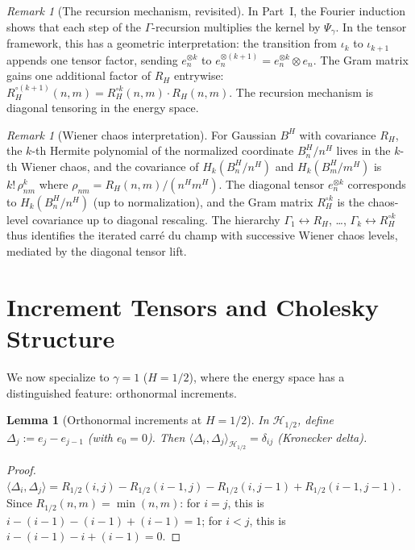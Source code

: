 \documentclass[11pt,a4paper]{article}
\theoremstyle{plain}
\newtheorem{lemma}[theorem]{Lemma}
\theoremstyle{definition}
\theoremstyle{remark}
\newtheorem{remark}[theorem]{Remark}
\begin{document}
\begin{remark}[The recursion mechanism, revisited]
\label{rem:recursion}
In Part~I, the Fourier induction shows that each step
of the $\Gamma$-recursion multiplies the kernel by
$\Psi_\gamma$.  In the tensor framework, this has a
geometric interpretation: the transition from
$\iota_k$ to $\iota_{k+1}$ appends one tensor factor,
sending $e_n^{\otimes k}$ to $e_n^{\otimes(k+1)}
= e_n^{\otimes k} \otimes e_n$.  The Gram matrix
gains one additional factor of $R_H$ entrywise:
$R_H^{\circ(k+1)}(n,m) = R_H^{\circ k}(n,m) \cdot R_H(n,m)$.
The recursion mechanism is diagonal tensoring in the
energy space.
\end{remark}

\begin{remark}[Wiener chaos interpretation]
\label{rem:chaos}
For Gaussian $B^H$ with covariance $R_H$, the
$k$-th Hermite polynomial of the normalized coordinate
$B_n^H / n^H$ lives in the $k$-th Wiener chaos, and the
covariance of $H_k(B_n^H/n^H)$ and $H_k(B_m^H/m^H)$
is $k!\,\rho_{nm}^k$ where
$\rho_{nm} = R_H(n,m)/(n^H m^H)$.
The diagonal tensor $e_n^{\otimes k}$ corresponds to
$H_k(B_n^H/n^H)$ (up to normalization), and the Gram
matrix $R_H^{\circ k}$ is the chaos-level covariance
up to diagonal rescaling.  The hierarchy
$\Gamma_1 \leftrightarrow R_H$, \ldots,
$\Gamma_k \leftrightarrow R_H^{\circ k}$
thus identifies the iterated carr\'e du champ with
successive Wiener chaos levels, mediated by the diagonal
tensor lift.
\end{remark}


\section{Increment Tensors and Cholesky Structure}
\label{sec:increment}

We now specialize to $\gamma = 1$ ($H = 1/2$),
where the energy space has a distinguished feature:
orthonormal increments.

\begin{lemma}[Orthonormal increments at $H = 1/2$]
\label{lem:increments}
In $\mathcal{H}_{1/2}$, define $\Delta_j := e_j - e_{j-1}$
(with $e_0 = 0$).  Then
$\langle \Delta_i, \Delta_j \rangle_{\mathcal{H}_{1/2}}
= \delta_{ij}$ (Kronecker delta).
\end{lemma}

\begin{proof}
$\langle \Delta_i, \Delta_j \rangle
= R_{1/2}(i,j) - R_{1/2}(i-1,j) - R_{1/2}(i,j-1)
+ R_{1/2}(i-1,j-1)$.
Since $R_{1/2}(n,m) = \min(n,m)$:
for $i = j$, this is $i - (i{-}1) - (i{-}1) + (i{-}1) = 1$;
for $i < j$, this is $i - (i{-}1) - i + (i{-}1) = 0$.
\end{proof}
\end{document}
